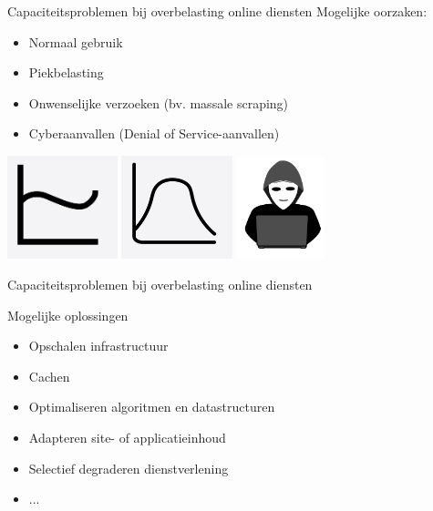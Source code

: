 \documentclass{beamer}
\begin{document}
\begin{frame}{Capaciteitsproblemen bij overbelasting online diensten}
    Mogelijke oorzaken:
    \begin{itemize}
        \item Normaal gebruik
        \item Piekbelasting
        \item Onwenselijke verzoeken (bv. massale scraping)
        \item Cyberaanvallen (Denial of Service-aanvallen)
    \end{itemize}
    \begin{center}
        \includegraphics[height = 3cm]{fluctuaties.png}
        \includegraphics[height = 3cm]{piek.png}
        \includegraphics[height = 3cm]{hacker.png}        
    \end{center}
\end{frame}


\begin{frame}{Capaciteitsproblemen bij overbelasting online diensten}
    \Large{
        Mogelijke oplossingen
        \begin{itemize}
            \item Opschalen infrastructuur
            \item Cachen
            \item Optimaliseren algoritmen en datastructuren
            \item Adapteren site- of applicatieinhoud
            \item Selectief degraderen dienstverlening
            \item ...
        \end{itemize}
    }
\end{frame}
\end{document}
